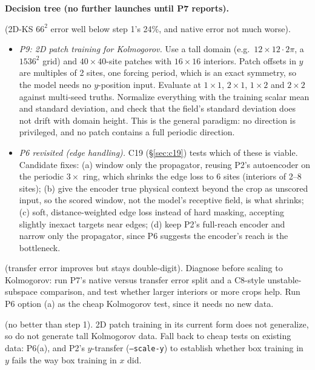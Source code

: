 \documentclass[11pt]{article}
\begin{document}
\textbf{Decision tree (no further launches until P7 reports).}
\begin{description}[leftmargin=1em]
\item[P7 transfers well] (2D-KS $66^2$ error well below step 1's 24\%,
  and native error not much worse).
  \begin{itemize}
  \item \emph{P9: 2D patch training for Kolmogorov.} Use a tall domain
    (e.g.\ $12\times12\cdot2\pi$, a $1536^2$ grid) and $40\times40$-site
    patches with $16\times16$ interiors. Patch offsets in $y$ are
    multiples of 2 sites, one forcing period, which is an exact symmetry,
    so the model needs no $y$-position input. Evaluate at $1\times1$,
    $2\times1$, $1\times2$ and $2\times2$ against multi-seed truths.
    Normalize everything with the training scalar mean and standard
    deviation, and check that the field's standard deviation does not
    drift with domain height. This is the general paradigm: no direction
    is privileged, and no patch contains a full periodic direction.
  \item \emph{P6 revisited (edge handling).} C19 (\S\ref{sec:c19}) tests
    which of these is viable. Candidate fixes:
    (a) window only the propagator, reusing P2's autoencoder on the
    periodic $3\times$ ring, which shrinks the edge loss to 6 sites
    (interiors of 2--8 sites);
    (b) give the encoder true physical context beyond the crop as
    unscored input, so the scored window, not the model's receptive
    field, is what shrinks;
    (c) soft, distance-weighted edge loss instead of hard masking,
    accepting slightly inexact targets near edges;
    (d) keep P2's full-reach encoder and narrow only the propagator,
    since P6 suggests the encoder's reach is the bottleneck.
  \end{itemize}
\item[P7 partially works] (transfer error improves but stays
  double-digit). Diagnose before scaling to Kolmogorov: run P7's native
  versus transfer error split and a C8-style unstable-subspace
  comparison, and test whether larger interiors or more crops help.
  Run P6 option (a) as the cheap Kolmogorov test, since it needs no new
  data.
\item[P7 fails] (no better than step 1). 2D patch training in its
  current form does not generalize, so do not generate tall Kolmogorov
  data. Fall back to cheap tests on existing data: P6(a), and P2's
  $y$-transfer (\texttt{--scale-y}) to establish whether box training
  in $y$ fails the way box training in $x$ did.
\end{description}
\end{document}
